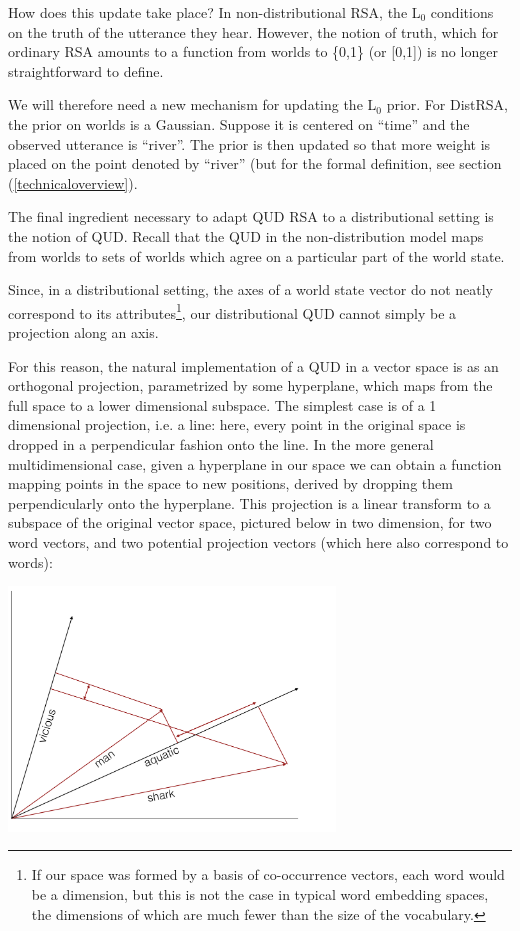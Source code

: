 \documentclass[10pt,letterpaper,twocolumn]{article}
\begin{document}
How does this update take place? In non-distributional RSA, the L$_0$ conditions on the truth of the utterance they hear. However, the notion of truth, which for ordinary RSA amounts to a function from worlds to \{0,1\} (or [0,1]) is no longer straightforward to define. 

We will therefore need a new mechanism for updating the L$_0$ prior. For DistRSA, the prior on worlds is a Gaussian. Suppose it is centered on ``time'' and the observed utterance is ``river''. The prior is then updated so that more weight is placed on the point denoted by ``river'' (but for the formal definition, see section (\ref{technicaloverview}). 

The final ingredient necessary to adapt QUD RSA to a distributional setting is the notion of QUD. Recall that the QUD in the non-distribution model maps from worlds to sets of worlds which agree on a particular part of the world state. 

Since, in a distributional setting, the axes of a world state vector do not neatly correspond to its attributes\footnote{If our space was formed by a basis of co-occurrence vectors, each word would be a dimension, but this is not the case in typical word embedding spaces, the dimensions of which are much fewer than the size of the vocabulary.}, our distributional QUD cannot simply be a projection along an axis. 

For this reason, the natural implementation of a QUD in a vector space is as an orthogonal projection, parametrized by some hyperplane, which maps from the full space to a lower dimensional subspace. The simplest case is of a 1 dimensional projection, i.e. a line: here, every point in the original space is dropped in a perpendicular fashion onto the line. In the more general multidimensional case, given a hyperplane in our space we can obtain a function mapping points in the space to new positions, derived by dropping them perpendicularly onto the hyperplane. This projection is a linear transform to a subspace of the original vector space, pictured below in two dimension, for two word vectors, and two potential projection vectors (which here also correspond to words):

\includegraphics[height=6.5cm]{diagram2.pdf}
\end{document}
